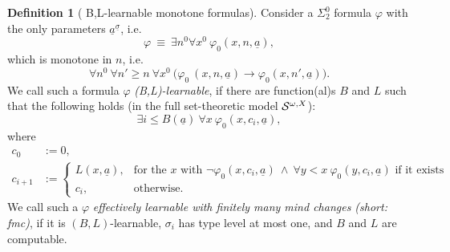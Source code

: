 \documentclass[1p]{elsarticle}
\newcommand{\tup}{\underline} %
\newcommand{\Telse}{\text{otherwise}}
\theoremstyle{plain}
\theoremstyle{definition}
\newtheorem{dfn}[thm]{Definition}
\theoremstyle{remark}
\renewcommand{\phi}{\varphi}
\theoremstyle{definition}
\begin{document}
% 
%
\begin{dfn}[ B,L-learnable monotone formulas]\label{d:fmcMon}
Consider a $\Sigma^0_2$ formula $\phi$ with the only parameters $\tup a^{\tup \sigma}$, i.e.
\[\phi\ \equiv\ \exists n^0 \forall x^0\ \phi_0(x,n,\tup a),\]
which is monotone in $n$, i.e.
\[ 
\forall n^0\ \forall n'\ge n\ \forall x^0\ \big(  \phi_0\ (x,n,\tup a) \rightarrow  \phi_0(x,n',\tup a) \big).
\]
We call such a formula $\phi$ 
{\em (B,L)-learnable},
if there are function(al)s $B$ and $L$ such that the following holds 
(in the full set-theoretic model ${\cal S}^{\omega,X}$):
\[ 
\exists i\leq B(\tup a)\ \forall x\ \phi_0(x,c_i,\tup a),\] where
\begin{align*}
c_0&:=0,\\
c_{i+1}&:=
\begin{cases}
L(x, \tup a),&\text{for the $x$ with } \neg\phi_0(x,c_i,\tup a)\ \wedge\ \forall y<x\ \phi_0(y,c_i,\tup a) \text{ if it exists}\\
c_i,&\Telse.
\end{cases}
\end{align*}
We call such a $\phi$ 
{\em effectively learnable with finitely many mind changes (short: fmc)},
if it is $(B,L)$-learnable, $\sigma_i$ has type level at most one, and $B$ and $L$ are computable.
\end{dfn}
\end{document}
